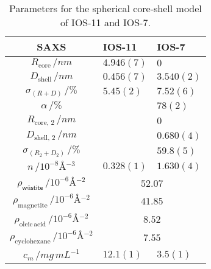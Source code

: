 \documentclass[\main/dresen_thesis.tex]{subfiles}
\begin{document}
    \begin{table}[!htbp]
      \centering
      \caption{\label{tab:looselyPackedNP:nanoparticle:sas}Parameters for the spherical core-shell model of IOS-11 and IOS-7.}
      \begin{tabular}{ c | l | l }
        \rule{0pt}{2ex} \textbf{SAXS}  & \textbf{IOS-11} & \textbf{IOS-7} \\
        \hline
        \rule{0pt}{2ex} $R_\mathrm{core} \, / \unit{nm}$                                    & $4.946(7)$           & $0$\\
        \rule{0pt}{2ex} $D_\mathrm{shell}\, / \unit{nm}$                                    & $0.456(7)$           & $3.540(2)$    \\
        \rule{0pt}{2ex} $\sigma_{(R+D)}\, / \unit{\%}$                                      & $5.45(2)$            & $7.52(6)$  \\
        \rule{0pt}{2ex} $\alpha \, / \unit{\%}$                                             &                      & $78(2)$\\
        \rule{0pt}{2ex} $R_{\mathrm{core},\, 2} \, / \unit{nm}$                             &                      & $0$\\
        \rule{0pt}{2ex} $D_{\mathrm{shell}, \, 2}\, / \unit{nm}$                            &                      & $0.680(4)$    \\
        \rule{0pt}{2ex} $\sigma_{(R_2 + D_2)}\, / \unit{\%}$                                &                      & $59.8(5)$   \\
        \rule{0pt}{2ex} $n \, / \unit{10^{-8} \angstrom^{-3}}$                              & $0.328(1)$           & $1.630(4)$\\
        \hline
        \rule{0pt}{2ex} $\rho_\textsf{w\"ustite} \, / \unit{10^{-6} \angstrom^{-2}}$        & \multicolumn{2}{c}{$52.07$}\\
        \rule{0pt}{2ex} $\rho_\mathrm{magnetite} \, / \unit{10^{-6} \angstrom^{-2}}$        & \multicolumn{2}{c}{$41.85$}\\
        \rule{0pt}{2ex} $\rho_\mathrm{oleic\, acid} \, / \unit{10^{-6} \angstrom^{-2}}$     & \multicolumn{2}{c}{$8.52$}\\
        \rule{0pt}{2ex} $\rho_\mathrm{cyclohexane} \, / \unit{10^{-6} \angstrom^{-2}}$      & \multicolumn{2}{c}{$7.55$}\\
        \hline
        \rule{0pt}{2ex} $c_m \, / \unit{mg\, mL^{-1}}$                                      & $12.1(1)$            & $3.5(1)$\\

\end{tabular}
\end{table}
\end{document}
